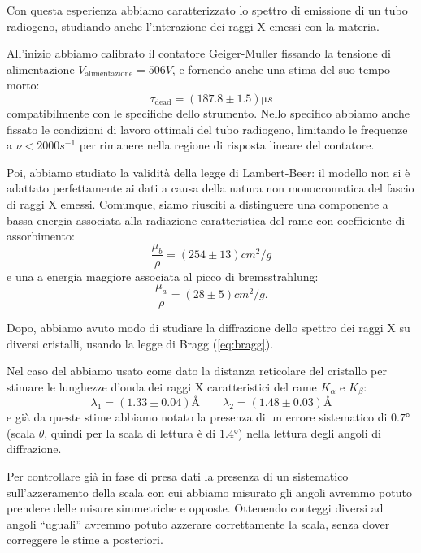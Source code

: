 
Con questa esperienza abbiamo caratterizzato lo spettro di emissione di un tubo radiogeno, studiando anche l'interazione dei raggi X emessi con la materia.

All'inizio abbiamo calibrato il contatore Geiger-Muller fissando la tensione di alimentazione $ V_\text{alimentazione} = 506 \unit{V} $, e fornendo anche una stima del suo tempo morto:
\begin{equation}
\tau_\text{dead} = (187.8 \pm 1.5) \unit{\micro s}
\end{equation}
compatibilmente con le specifiche dello strumento.
Nello specifico abbiamo anche fissato le condizioni di lavoro ottimali del tubo radiogeno, limitando le frequenze a $ \nu < 2000 \unit{s^{-1}}$ per rimanere nella regione di risposta lineare del contatore.

Poi, abbiamo studiato la validità della legge di Lambert-Beer: il modello non si è adattato perfettamente ai dati a causa della natura non monocromatica del fascio di raggi X emessi.
Comunque, siamo riusciti a distinguere una componente a bassa energia associata alla radiazione caratteristica del rame con coefficiente di assorbimento:
\begin{equation}
\frac{\mu_b}{\rho} = (254 \pm 13) \unit{cm^2 / g}
\end{equation}
e una a energia maggiore associata al picco di bremsstrahlung:
\begin{equation}
\frac{\mu_a}{\rho} = (28 \pm 5) \unit{cm^2 / g}.
\end{equation}

Dopo, abbiamo avuto modo di studiare la diffrazione dello spettro dei raggi X su diversi cristalli, usando la legge di Bragg (\ref{eq:bragg}).

Nel caso del  abbiamo usato come dato la distanza reticolare del cristallo per stimare le lunghezze d'onda dei raggi X caratteristici del rame $K_\alpha$ e $K_\beta$:
\begin{equation}
\lambda_1 = (1.33 \pm 0.04) \unit{\angstrom} \qquad \lambda_2 = (1.48 \pm0.03) \unit{\angstrom}
\end{equation}
e già da queste stime abbiamo notato la presenza di un errore sistematico di $ 0.7 \unit{\degree} $ (scala $ \theta $, quindi per la scala di lettura è di $ 1.4 \unit{\degree} $) nella lettura degli angoli di diffrazione.

Per controllare già in fase di presa dati la presenza di un sistematico sull'azzeramento della scala con cui abbiamo misurato gli angoli avremmo potuto prendere delle misure simmetriche e opposte.
Ottenendo conteggi diversi ad angoli ``uguali'' avremmo potuto azzerare correttamente la scala, senza dover correggere le stime a posteriori.

